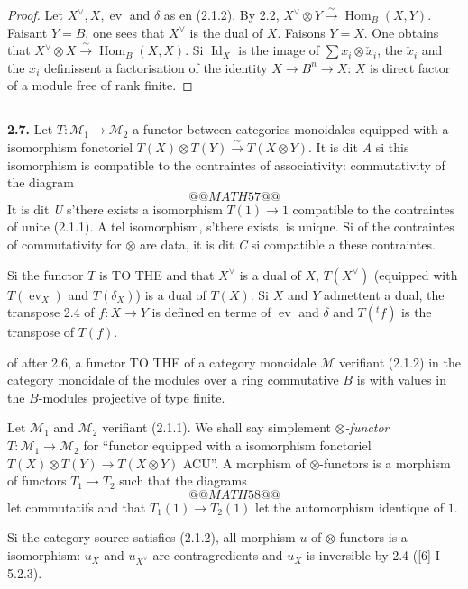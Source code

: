 \documentclass[12pt,a4paper]{article}
\theoremstyle{plain}
\theoremstyle{definition}
\theoremstyle{remark}
\DeclareMathOperator{\Hom}{Hom}
\DeclareMathOperator{\Id}{Id}
\DeclareMathOperator{\ev}{ev}
\begin{document}
\begin{proof}
Let $X^\vee, X, \ev$ and $\delta$ as en (2.1.2). By 2.2, $X^\vee \otimes Y \xrightarrow{\sim} \Hom_B(X,Y)$. Faisant $Y = B$, one sees that $X^\vee$ is the dual of $X$. Faisons $Y = X$. One obtains that $X^\vee \otimes X \xrightarrow{\sim} \Hom_B(X,X)$. Si $\Id_X$ is the image of $\sum x_i \otimes \check{x}_i$, the $\check{x}_i$ and the $x_i$ definissent a factorisation of the identity $X \to B^n \to X$: $X$ is direct factor of a module free of rank finite.
\end{proof}

\subsection{}

\textbf{2.7.} Let $T : \mathcal{M}_1 \to \mathcal{M}_2$ a functor between categories monoidales equipped with a isomorphism fonctoriel $T(X) \otimes T(Y) \xrightarrow{\sim} T(X \otimes Y)$. It is dit \emph{A} si this isomorphism is compatible to the contraintes of associativity: commutativity of the diagram
\[
@@MATH57@@
\]
It is dit \emph{U} s'there exists a isomorphism $T(1) \to 1$ compatible to the contraintes of unite (2.1.1). A tel isomorphism, s'there exists, is unique. Si of the contraintes of commutativity for $\otimes$ are data, it is dit \emph{C} si compatible a these contraintes.

Si the functor $T$ is TO THE and that $X^\vee$ is a dual of $X$, $T(X^\vee)$ (equipped with $T(\ev_X)$ and $T(\delta_X)$) is a dual of $T(X)$. Si $X$ and $Y$ admettent a dual, the transpose 2.4 of $f : X \to Y$ is defined en terme of $\ev$ and $\delta$ and $T({}^t f)$ is the transpose of $T(f)$.

of after 2.6, a functor TO THE of a category monoidale $\mathcal{M}$ verifiant (2.1.2) in the category monoidale of the modules over a ring commutative $B$ is with values in the $B$-modules projective of type finite.

Let $\mathcal{M}_1$ and $\mathcal{M}_2$ verifiant (2.1.1). We shall say simplement \emph{$\otimes$-functor} $T : \mathcal{M}_1 \to \mathcal{M}_2$ for ``functor equipped with a isomorphism fonctoriel $T(X) \otimes T(Y) \to T(X \otimes Y)$ ACU''. A morphism of $\otimes$-functors is a morphism of functors $T_1 \to T_2$ such that the diagrams
\[
@@MATH58@@
\]
let commutatifs and that $T_1(1) \to T_2(1)$ let the automorphism identique of $1$.

Si the category source satisfies (2.1.2), all morphism $u$ of $\otimes$-functors is a isomorphism: $u_X$ and $u_{X^\vee}$ are contragredients and $u_X$ is inversible by 2.4 ([6] I 5.2.3).
\end{document}
